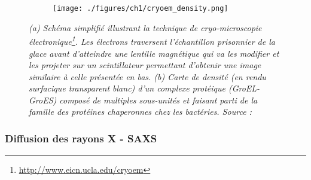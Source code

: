 \begin{figure}
  \hspace{0.2cm}
  \begin{subfigure}{.5\textwidth}
  \centering
  {\texttt{[image: ./figures/ch1/cryoem\_density.png]}}
    \label{Fig:cryoem_density}
  \end{subfigure}
  \hspace{0.2cm}
  \caption[(a) Schéma simplifié illustrant la technique de cryo-microscopie électronique. (b) Carte de densité électronique d'un complexe protéique.]{\it (a) Schéma simplifié illustrant la technique de cryo-microscopie électronique\footnote{\url{http://www.eicn.ucla.edu/cryoem}}. Les électrons traversent l'échantillon prisonnier de la glace avant d'atteindre une lentille magnétique qui va les modifier et les projeter sur un scintillateur permettant d'obtenir une image similaire à celle présentée en bas.
  (b) Carte de densité (en rendu surfacique transparent blanc) d'un complexe protéique (GroEL-GroES) composé de multiples sous-unités et faisant parti de la famille des protéines chaperonnes chez les bactéries. Source : \cite{hoang2013gemfitter}}
\end{figure}

\subsubsection{Diffusion des rayons X - SAXS}

